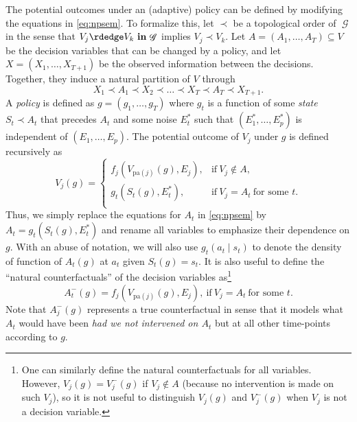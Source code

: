 \documentclass[12pt,a4paper]{article}
\theoremstyle{definition}
\newcommand{\pa}[0]{\text{pa}}
\newcommand{\indep}{\perp \!\!\! \perp}
\newcommand{\ingraph}[1]{~\textnormal{\bf in}\,#1}
\DeclareMathOperator{\gG}{\mathscr{G}}
\DeclareMathOperator{\sJ}{\mathcal{J}}
\DeclareMathOperator{\sK}{\mathcal{K}}
\begin{document}
The potential outcomes under an (adaptive) policy can be defined by
modifying the equations in \eqref{eq:npsem}. To formalize this, let
$\prec$ be a topological order of $\gG$ in the sense that $V_j \rdedge
V_k \ingraph{\gG}$ implies $V_j \prec V_k$. Let $A = (A_1,\dots, A_T)
\subseteq V$ be the decision variables that can be changed by a
policy, and let $X = (X_1, \dots, X_{T+1})$ be the observed
information between the decisions. Together, they induce a natural
partition of $V$ through
\[
  X_1 \prec A_1 \prec X_2 \prec \dots \prec X_T \prec A_T \prec X_{T+1}.
\]
A \emph{policy} is defined as $g = (g_1, \dots, g_T)$ where $g_t$
is a function of some \emph{state} $S_t \prec A_t$ that precedes $A_t$
and some noise $E^*_t$ such that $(E_1^{*}, \dots, E_p^{*})$ is
independent of $(E_1, \dots, E_p)$. The potential outcome of $V_j$
under $g$ is defined recursively as
\[
    V_j(g) =
    \begin{cases}
      f_j(V_{\pa(j)}(g), E_j),& \text{if}~V_j \not \in A, \\
      g_t(S_t(g), E^*_t),& \text{if}~V_j = A_t~\text{for some $t$}. \\
    \end{cases}
\]
Thus, we simply replace the equations for $A_t$ in \eqref{eq:npsem} by $A_t = g_t(S_t(g), E_t^{*})$ and rename all variables to emphasize their dependence on $g$. With an abuse of notation, we will also use $g_t(a_t \mid s_t)$ to denote
the density of function of $A_t(g)$ at $a_t$ given $S_t(g) = s_t$.
It is also useful to define the ``natural counterfactuals'' of the decision variables as\footnote{One can similarly define the natural counterfactuals for all variables. However, $V_j(g) = V_j^-(g)$ if $V_j \not \in A$ (because no intervention is made on such $V_j$), so it is not useful to distinguish $V_j(g)$ and $V_j^-(g)$ when $V_j$ is not a decision variable.}
\[
  A_t^-(g) = f_j(V_{\pa(j)}(g), E_j), ~ \text{if} ~ V_j = A_t~\text{for some $t$}.
\]
Note that $A_j^-(g)$ represents a true counterfactual in sense that it
models what $A_t$ would have been \emph{had we not intervened on
  $A_t$} but at all other time-points according to $g$.

%
\end{document}
